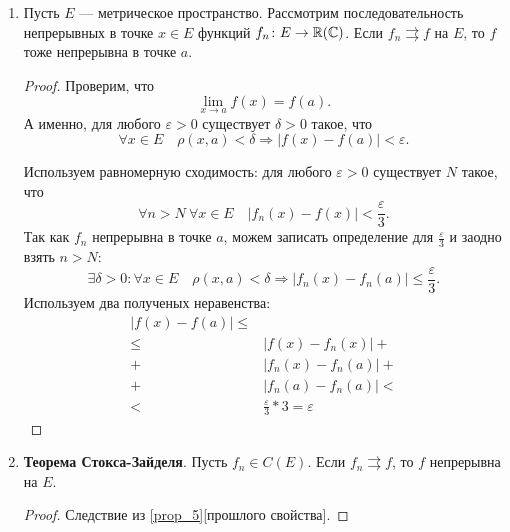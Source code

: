 \documentclass[11pt,dvipsnames]{report}
\begin{document}
\begin{prop}
\begin{enumerate}
\begin{proof}
\begin{description}
			Устремим $ m \to  \infty$. Тогда \[
			    \lvert f_n(x) - f(x) \rvert \le  \varepsilon 
			.\] 
			По определению равномерной сходимости получаем, что $ f_n \rightrightarrows f$ на $ E$.
	        \end{description} 
	    \end{proof}
	\item \label{prop_5} Пусть $ E$ --- метрическое пространство. Рассмотрим последовательность непрерывных в точке $ x \in E$ функций $ f_n \colon E \to \mathbb{R}(\mathbb{C}) $. Если $ f_n \rightrightarrows f$ на $ E$, то  $ f$ тоже непрерывна в точке  $ a$.
	     \begin{proof}
	        Проверим, что 
		\[
		    \lim_{x \to  a} f(x) = f(a)
		.\] 
		А именно, для любого $ \varepsilon  > 0$ существует $ \delta > 0$ такое, что
		\[
		    \forall x \in E \quad \rho(x, a) < \delta \Longrightarrow \lvert f(x) - f(a) \rvert  < \varepsilon 
		.\] 

		Используем равномерную сходимость: для любого  $ \varepsilon > 0$ существует $ N$ такое, что
		\begin{equation}\label{eq:koshi_1}
		    \forall n > N ~ \forall x \in E \quad \lvert f_n(x) - f(x) \rvert  < \frac{\varepsilon}{3}
		.\end{equation}
		Так как $ f_n$ непрерывна в точке $ a$, можем записать определение для  $ \frac{\varepsilon}{3}$ и заодно взять $ n > N$:
		\[
		    \exists \delta >0 \colon \forall x \in  E \quad \rho(x, a) < \delta \Longrightarrow \lvert f_n(x) - f_n(a) \rvert \le \frac{\varepsilon}{3}
		.\] 
		Используем два полученых неравенства:
		\begin{align*}
		    \lvert f(x) - f(a) \rvert \le  & \\
					       \le  & \lvert f(x) - f_n(x) \rvert + \\
					       + & \lvert f_n(x) - f_n(a) \rvert + \\
					       + & \lvert f_n(a) - f_n(a) \rvert < \\
					       < & \frac{\varepsilon}{3} * 3 = \varepsilon 
		\end{align*}
	    \end{proof}

	\item {\bf Теорема Стокса-Зайделя}. Пусть $ f_n \in C(E)$. Если $ f_n \rightrightarrows f$, то $ f$ непрерывна на $ E$. 
	    \begin{proof}
		Следствие из \ref{prop_5}[прошлого свойства].
	    \end{proof}
    \end{enumerate}
\end{prop}
\end{document}
